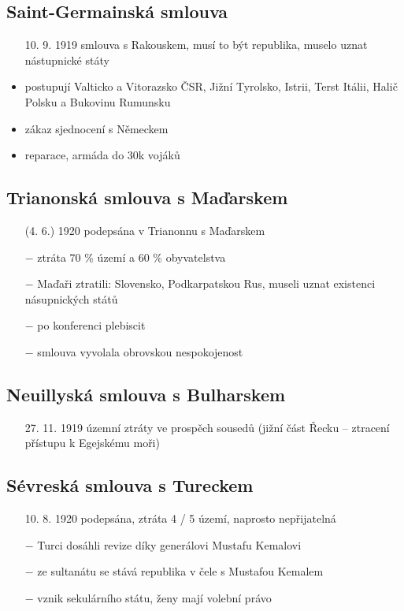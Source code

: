 \documentclass{article}
\begin{document}
\subsection*{Saint-Germainská smlouva }
\begin{itemize}
  \item[10. 9. 1919] smlouva s Rakouskem, musí to být republika, muselo uznat nástupnické státy
  \item postupují Valticko a Vitorazsko ČSR, Jižní Tyrolsko, Istrii, Terst Itálii, Halič Polsku a Bukovinu Rumunsku
  \item zákaz sjednocení s Německem
  \item reparace, armáda do 30k vojáků
\end{itemize}

\subsection*{Trianonská smlouva s Maďarskem}
\begin{itemize}
    \vspace{-0.5em}
    \setlength\itemsep{0.15em}
    \item[(4. 6.) 1920] podepsána v Trianonnu s Maďarskem
    \item[$-$] ztráta 70 \% území a 60 \% obyvatelstva
    \item[$-$] Maďaři ztratili: Slovensko, Podkarpatskou Rus, museli uznat existenci násupnických států
    \item[$-$] po konferenci plebiscit
    \item[$-$] smlouva vyvolala obrovskou nespokojenost
\end{itemize}

\subsection*{Neuillyská smlouva s Bulharskem}
\begin{itemize}
    \vspace{-0.5em}
    \setlength\itemsep{0.15em}
    \item[27. 11. 1919] územní ztráty ve prospěch sousedů (jižní část Řecku -- ztracení přístupu k Egejskému moři)
\end{itemize}

\subsection*{Sévreská smlouva s Tureckem}
\begin{itemize}
    \vspace{-0.5em}
    \setlength\itemsep{0.15em}
    \item[10. 8. 1920] podepsána, ztráta 4 / 5 území, naprosto nepřijatelná
    \item[$-$] Turci dosáhli revize díky generálovi Mustafu Kemalovi
    \item[$-$] ze sultanátu se stává republika v čele s Mustafou Kemalem
    \item[$-$] vznik sekulárního státu, ženy mají volební právo
\end{itemize}
\end{document}
